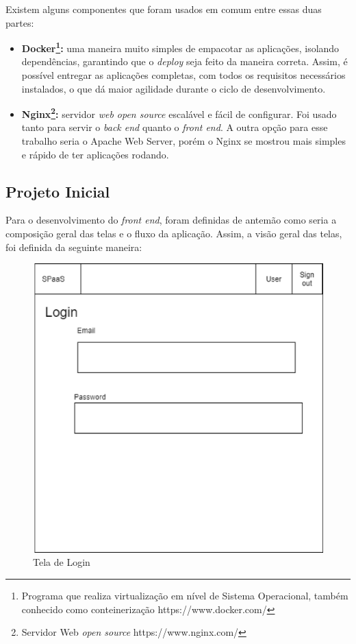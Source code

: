 \documentclass[11pt,twoside]{article}
\begin{document}
Existem alguns componentes que foram usados em comum entre essas duas partes:

\begin{itemize}
  \item \textbf{Docker\footnote{Programa que realiza virtualização em nível de Sistema Operacional, também conhecido como conteinerização https://www.docker.com/}:} 
  uma maneira muito simples de empacotar as aplicações, isolando dependências, garantindo que o \emph{deploy} seja feito da maneira correta. Assim, é possível entregar as aplicações completas, com
  todos os requisitos necessários instalados, o que dá maior agilidade durante o ciclo de desenvolvimento.
  \item \textbf{Nginx\footnote{Servidor Web \emph{open source} https://www.nginx.com/}:} servidor \emph{web open source} escalável e fácil de configurar. Foi usado tanto para servir o \emph{back end} quanto o \emph{front end}. 
  A outra opção para esse trabalho seria o Apache Web Server, porém o Nginx se mostrou mais simples e rápido de ter aplicações rodando.
\end{itemize}

\subsection{Projeto Inicial}

Para o desenvolvimento do \emph{front end}, foram definidas de antemão como seria a composição geral das telas e o fluxo da aplicação. Assim, a visão geral das telas, foi definida da seguinte maneira:

\begin{figure}[!h]
  \centering
  \includegraphics[scale=0.4]{login.eps}
  \caption{Tela de Login}
  \label{fig:loginScreen}
\end{figure}
\end{document}

